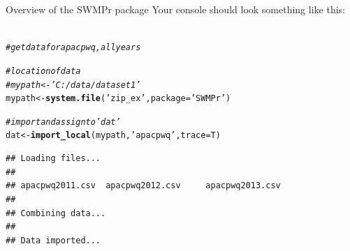 \documentclass[xcolor=svgnames]{beamer}\usepackage[]{graphicx}\usepackage[]{color}
\makeatletter
\newcommand{\hlstr}[1]{\textcolor[rgb]{0.192,0.494,0.8}{#1}}%
\newcommand{\hlcom}[1]{\textcolor[rgb]{0.678,0.584,0.686}{\textit{#1}}}%
\newcommand{\hlstd}[1]{\textcolor[rgb]{0.345,0.345,0.345}{#1}}%
\newcommand{\hlkwb}[1]{\textcolor[rgb]{0.69,0.353,0.396}{#1}}%
\newcommand{\hlkwc}[1]{\textcolor[rgb]{0.333,0.667,0.333}{#1}}%
\newcommand{\hlkwd}[1]{\textcolor[rgb]{0.737,0.353,0.396}{\textbf{#1}}}%
\newenvironment{kframe}{%
 \def\at@end@of@kframe{}%
 \ifinner\ifhmode%
  \def\at@end@of@kframe{\end{minipage}}%
  \begin{minipage}{\columnwidth}%
 \fi\fi%
 \def\FrameCommand##1{\hskip\@totalleftmargin \hskip-\fboxsep
 \colorbox{shadecolor}{##1}\hskip-\fboxsep
     \hskip-\linewidth \hskip-\@totalleftmargin \hskip\columnwidth}%
 \MakeFramed {\advance\hsize-\width
   \@totalleftmargin\z@ \linewidth\hsize
   \@setminipage}}%
 {\par\unskip\endMakeFramed%
 \at@end@of@kframe}
\newenvironment{knitrout}{}{} %
\makeatother
\begin{document}
\begin{frame}[fragile]{Overview of the SWMPr package}
Your console should look something like this:\\~\\
\begin{knitrout}
\color{fgcolor}\begin{kframe}
\begin{alltt}
\hlcom{# get data for apacpwq, all years}

\hlcom{# location of data}
\hlcom{# mypath <- 'C:/data/dataset1'}
\hlstd{mypath} \hlkwb{<-} \hlkwd{system.file}\hlstd{(}\hlstr{'zip_ex'}\hlstd{,} \hlkwc{package} \hlstd{=} \hlstr{'SWMPr'}\hlstd{)}

\hlcom{# import and assign to 'dat'}
\hlstd{dat} \hlkwb{<-} \hlkwd{import_local}\hlstd{(mypath,} \hlstr{'apacpwq'}\hlstd{,} \hlkwc{trace} \hlstd{= T)}
\end{alltt}
\begin{verbatim}
## Loading files...
## 
## apacpwq2011.csv 	apacpwq2012.csv 	apacpwq2013.csv 	
## 
## Combining data...
## 
## Data imported...
\end{verbatim}
\end{kframe}
\end{knitrout}
\end{frame}
\end{document}
